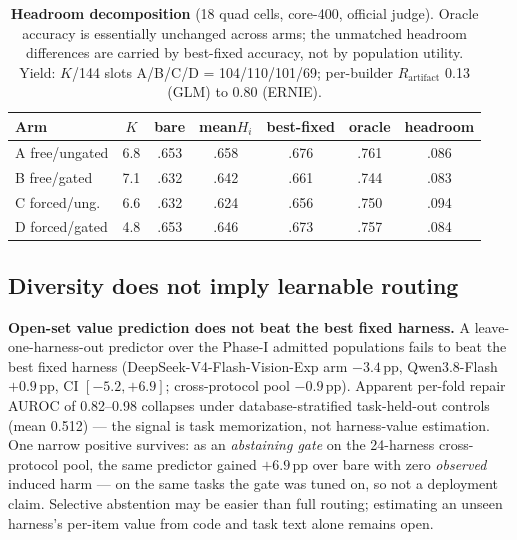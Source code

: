 \begin{table}[t]
\centering
\footnotesize
\begin{tabular}{@{}lcccccc@{}}
\toprule
Arm & $K$ & bare & mean$H_i$ & best-fixed & oracle & headroom \\
\midrule
A free/ungated  & 6.8 & .653 & .658 & .676 & .761 & .086 \\
B free/gated    & 7.1 & .632 & .642 & .661 & .744 & .083 \\
C forced/ung.   & 6.6 & .632 & .624 & .656 & .750 & .094 \\
D forced/gated  & 4.8 & .653 & .646 & .673 & .757 & .084 \\
\bottomrule
\end{tabular}
\caption{\textbf{Headroom decomposition} (18 quad cells, core-400, official
judge). Oracle accuracy is essentially unchanged across arms; the unmatched
headroom differences are carried by best-fixed accuracy, not by population
utility. Yield: $K$/144 slots A/B/C/D = 104/110/101/69; per-builder
$R_{\mathrm{artifact}}$ 0.13 (GLM) to 0.80 (ERNIE).}
\label{tab:decomp}
\end{table}

\subsection{Diversity does not imply learnable routing}\label{sec:boundary}
\textbf{Open-set value prediction does not beat the best fixed harness.} A
leave-one-harness-out predictor over the Phase-I admitted populations fails
to beat the best fixed harness (DeepSeek-V4-Flash-Vision-Exp arm $-3.4$\,pp,
Qwen3.8-Flash $+0.9$\,pp, CI $[-5.2, +6.9]$; cross-protocol pool
$-0.9$\,pp). Apparent per-fold repair AUROC of 0.82--0.98 collapses under
database-stratified task-held-out controls (mean 0.512) --- the signal is
task memorization, not harness-value estimation. One narrow positive
survives: as an \emph{abstaining gate} on the 24-harness cross-protocol
pool, the same predictor gained $+6.9$\,pp over bare with zero
\emph{observed} induced harm --- on the same tasks the gate was tuned on,
so not a deployment claim. Selective abstention may be easier than full
routing; estimating an unseen harness's per-item value from code and task
text alone remains open.
